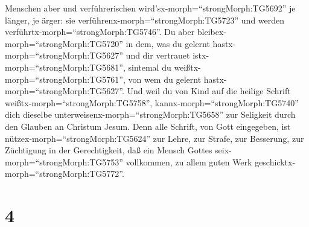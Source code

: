 Menschen aber und verführerischen wird'sx-morph=``strongMorph:TG5692''
je länger, je ärger: sie verführenx-morph=``strongMorph:TG5723'' und
werden verführtx-morph=``strongMorph:TG5746''.  Du aber
bleibex-morph=``strongMorph:TG5720'' in dem, was du gelernt
hastx-morph=``strongMorph:TG5627'' und dir vertrauet
istx-morph=``strongMorph:TG5681'', sintemal du
weißtx-morph=``strongMorph:TG5761'', von wem du gelernt
hastx-morph=``strongMorph:TG5627''.  Und weil du von Kind
auf die heilige Schrift weißtx-morph=``strongMorph:TG5758'',
kannx-morph=``strongMorph:TG5740'' dich dieselbe
unterweisenx-morph=``strongMorph:TG5658'' zur Seligkeit durch den
Glauben an Christum Jesum.  Denn alle Schrift, von Gott
eingegeben, ist nütze\textbar x-morph=``strongMorph:TG5624'' zur Lehre,
zur Strafe, zur Besserung, zur Züchtigung in der Gerechtigkeit,
 daß ein Mensch Gottes seix-morph=``strongMorph:TG5753''
vollkommen, zu allem guten Werk geschicktx-morph=``strongMorph:TG5772''.

\hypertarget{section-3}{%
\section{4}\label{section-3}}

